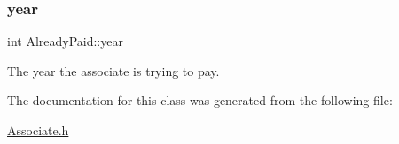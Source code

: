 \mbox{\label{classAlreadyPaid_aca0124c0c69671e1452020fc8697c3ca}} 
\subsubsection{\texorpdfstring{year}{year}}
{\footnotesize\ttfamily int Already\+Paid\+::year\hspace{0.3cm}{\ttfamily [private]}}



The year the associate is trying to pay. 



The documentation for this class was generated from the following file\+:\begin{DoxyCompactItemize}
\item 
\hyperlink{Associate_8h}{Associate.\+h}\end{DoxyCompactItemize}
